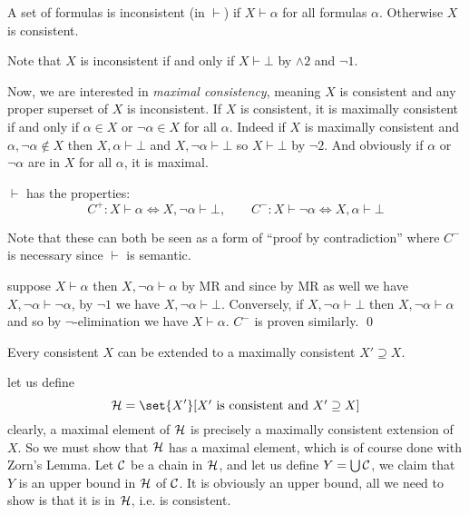 \bdefn

    A set of formulas is {\emphcolor inconsistent} (in $\vdash$) if $X\vdash\alpha$ for all
    formulas $\alpha$.
    Otherwise $X$ is {\emphcolor consistent}.

\edefn

Note that $X$ is inconsistent if and only if $X\vdash\bot$ by $\land2$ and $\neg1$.

Now, we are interested in {\it maximal consistency}, meaning $X$ is consistent and any proper
superset of $X$ is inconsistent.
If $X$ is consistent, it is maximally consistent if and only if $\alpha\in X$ or $\neg\alpha\in X$
for all $\alpha$.
Indeed if $X$ is maximally consistent and $\alpha,\neg\alpha\notin X$ then $X,\alpha\vdash\bot$
and $X,\neg\alpha\vdash\bot$ so $X\vdash\bot$ by $\neg2$.
And obviously if $\alpha$ or $\neg\alpha$ are in $X$ for all $\alpha$, it is maximal.

\blemm

    $\vdash$ has the properties:
    $$ C^+\colon X\vdash\alpha\iff X,\neg\alpha\vdash\bot,
    \qquad C^-\colon X\vdash\neg\alpha\iff X,\alpha\vdash\bot $$

\elemm

Note that these can both be seen as a form of ``proof by contradiction'' where $C^-$ is necessary
since $\vdash$ is semantic.

\Proof suppose $X\vdash\alpha$ then $X,\neg\alpha\vdash\alpha$ by MR and since by MR as well we
have $X,\neg\alpha\vdash\neg\alpha$, by $\neg1$ we have $X,\neg\alpha\vdash\bot$.
Conversely, if $X,\neg\alpha\vdash\bot$ then $X,\neg\alpha\vdash\alpha$ and so by
$\neg$-elimination we have $X\vdash\alpha$.
$C^-$ is proven similarly.
\qed

\blemm[title=Lindenbaum's Theorem]

    Every consistent $X$ can be extended to a maximally consistent $X'\supseteq X$.

\elemm

\Proof let us define
$$ {\cal H} = \set{X'}[\hbox{$X'$ is consistent and $X'\supseteq X$}] $$
clearly, a maximal element of ${\cal H}$ is precisely a maximally consistent extension of $X$.
So we must show that ${\cal H}$ has a maximal element, which is of course done with Zorn's Lemma.
Let ${\cal C}$ be a chain in ${\cal H}$, and let us define $Y=\bigcup{\cal C}$, we claim that
$Y$ is an upper bound in ${\cal H}$ of ${\cal C}$.
It is obviously an upper bound, all we need to show is that it is in ${\cal H}$, i.e. is
consistent.

